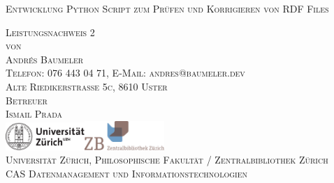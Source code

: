 

\begin{titlepage}

\begin{center}
\Large
\textsc{Entwicklung Python Script zum Prüfen und Korrigieren von RDF Files}\\

\vspace{2cm}

\textsc{Leistungsnachweis 2\\[0.5\baselineskip]
 von\\[0.5\baselineskip]
Andrés Baumeler\\
{\normalsize \textsc{Telefon: 076 443 04 71, E-Mail: andres@baumeler.dev }}\\
{\normalsize \textsc{Alte Riedikerstrasse 5c, 8610 Uster}}}\\


\vspace{3cm}
\textsc{Betreuer\\
Ismail Prada}\\

\vspace{2cm}
\textsc{ \includegraphics[width=3cm]{img/uzh_logo_d_pos.pdf}\hspace{1cm}\includegraphics[width=3cm]{img/zb-logo.pdf} \\
\normalsize{Universität Zürich, Philosophische Fakultät  / Zentralbibliothek Zürich}\\
\normalsize{CAS Datenmanagement und Informationstechnologien}}\\

\end{center}

\end{titlepage}
